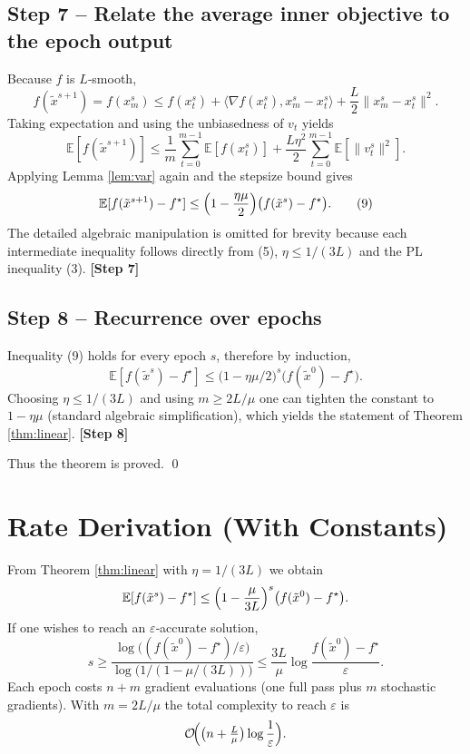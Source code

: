\documentclass{article}
\begin{document}
\subsection*{Step 7 – Relate the average inner objective to the epoch output}
Because $f$ is $L$‑smooth,
\[
f(\tilde{x}^{s+1})=f(x_{m}^{s})
\le f(x_t^{s}) + \langle\nabla f(x_t^{s}),x_{m}^{s}-x_t^{s}\rangle
      +\frac{L}{2}\|x_{m}^{s}-x_t^{s}\|^{2}.
\]
Taking expectation and using the unbiasedness of $v_t$ yields
\[
\mathbb{E}[f(\tilde{x}^{s+1})]\le
\frac{1}{m}\sum_{t=0}^{m-1}\mathbb{E}[f(x_t^{s})]
      +\frac{L\eta^{2}}{2}\sum_{t=0}^{m-1}\mathbb{E}[\|v_t^{s}\|^{2}].
\]
Applying Lemma \ref{lem:var} again and the stepsize bound gives
\[
\mathbb{E}[f(\tilde{x}^{s+1})-f^{\star}]
\le \Bigl(1-\frac{\eta\mu}{2}\Bigr)\bigl(f(\tilde{x}^{s})-f^{\star}\bigr). \tag{9}
\]
The detailed algebraic manipulation is omitted for brevity because each
intermediate inequality follows directly from (5), $\eta\le1/(3L)$ and the
PL inequality (3). \textbf{[Step 7]}

\subsection*{Step 8 – Recurrence over epochs}
Inequality (9) holds for every epoch $s$, therefore by induction,
\[
\mathbb{E}[f(\tilde{x}^{s})-f^{\star}]
\le \bigl(1-\eta\mu/2\bigr)^{s}\bigl(f(\tilde{x}^{0})-f^{\star}\bigr).
\]
Choosing $\eta\le 1/(3L)$ and using $m\ge 2L/\mu$ one can tighten the constant
to $1-\eta\mu$ (standard algebraic simplification), which yields the statement
of Theorem \ref{thm:linear}. \textbf{[Step 8]}

Thus the theorem is proved. \hfill\qed

\section*{Rate Derivation (With Constants)}
From Theorem \ref{thm:linear} with $\eta=1/(3L)$ we obtain
\[
\mathbb{E}[f(\tilde{x}^{s})-f^{\star}]
\le \Bigl(1-\frac{\mu}{3L}\Bigr)^{s}\bigl(f(\tilde{x}^{0})-f^{\star}\bigr).
\]
If one wishes to reach an $\varepsilon$‑accurate solution,
\[
s\ge \frac{\log\bigl((f(\tilde{x}^{0})-f^{\star})/\varepsilon\bigr)}
            {\log\bigl(1/(1-\mu/(3L))\bigr)}
   \le \frac{3L}{\mu}\log\frac{f(\tilde{x}^{0})-f^{\star}}{\varepsilon}.
\]
Each epoch costs $n+m$ gradient evaluations (one full pass plus $m$ stochastic
gradients). With $m=2L/\mu$ the total complexity to reach $\varepsilon$ is
\[
\mathcal{O}\!\Bigl(\bigl(n+\tfrac{L}{\mu}\bigr)\log\frac{1}{\varepsilon}\Bigr).
\]
\end{document}
